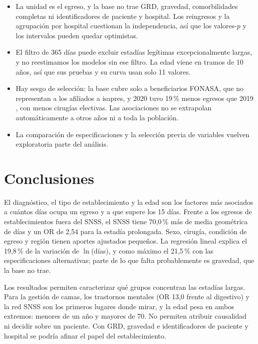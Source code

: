 \documentclass[10.5pt,a4paper,headings=small,abstract=false,bibliography=totoc,listof=totoc]{scrartcl}
\newcommand{\pct}{\,\%}
\begin{document}
\begin{itemize}\setlength\itemsep{0pt}
\item La unidad es el egreso, y la base no trae GRD, gravedad, comorbilidades completas ni identificadores de paciente y hospital. Los reingresos y la agrupación por hospital cuestionan la independencia, así que los valores-$p$ y los intervalos pueden quedar optimistas.
\item El filtro de 365 días puede excluir estadías legítimas excepcionalmente largas, y no reestimamos los modelos sin ese filtro. La edad viene en tramos de 10 años, así que sus pruebas y su curva usan solo 11 valores.
\item Hay sesgo de selección: la base cubre solo a beneficiarios FONASA, que no representan a los afiliados a isapres, y 2020 tuvo 19\pct{} menos egresos que 2019 \citep{barahona2021}, con menos cirugías electivas. Las asociaciones no se extrapolan automáticamente a otros años ni a toda la población.
\item La comparación de especificaciones y la selección previa de variables vuelven exploratoria parte del análisis.
\end{itemize}

\section{Conclusiones}

El diagnóstico, el tipo de establecimiento y la edad son los factores más asociados a cuántos días ocupa un egreso y a que supere los 15 días. Frente a los egresos de establecimientos fuera del SNSS, el SNSS tiene 70,0\pct{} más de media geométrica de días y un OR de 2,54 para la estadía prolongada. Sexo, cirugía, condición de egreso y región tienen aportes ajustados pequeños. La regresión lineal explica el 19,8\pct{} de la variación de $\ln$(días), y como máximo el 21,5\pct{} con las especificaciones alternativas; parte de lo que falta probablemente es gravedad, que la base no trae.

Los resultados permiten caracterizar qué grupos concentran las estadías largas. Para la gestión de camas, los trastornos mentales (OR 13,0 frente al digestivo) y la red SNSS son los primeros lugares donde mirar, y la edad pesa en ambos extremos: menores de un año y mayores de 70. No permiten atribuir causalidad ni decidir sobre un paciente. Con GRD, gravedad e identificadores de paciente y hospital se podría afinar el papel del establecimiento.\label{fincuerpo}
\end{document}
